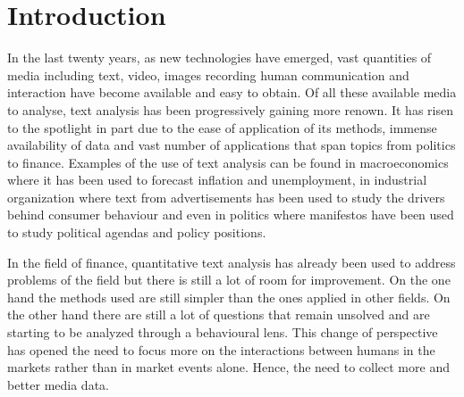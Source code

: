 \documentclass[a4paper, 12pt]{report}
\begin{document}
    
    
    
    
    
    
    
    
    
    \chapter{Introduction}
    
    In the last twenty years, as new technologies have emerged, vast quantities of media including text, video, images recording human communication and interaction have become available and easy to obtain. Of all these available media to analyse, text analysis has been progressively gaining more renown. It has risen to the spotlight in part due to the ease of application of its methods, immense availability of data and vast number of applications that span topics from politics to finance. Examples of the use of text analysis can be found in macroeconomics where it has been used to forecast inflation and unemployment, in industrial organization where text from advertisements has been used to study the drivers behind consumer behaviour and even in politics where manifestos have been used to study political agendas and policy positions. 
    
    In the field of finance, quantitative text analysis has already been used to address problems of the field but there is still a lot of room for improvement. On the one hand the methods used are still simpler than the ones applied in other fields. On the other hand there are still a lot of questions that remain unsolved and are starting to be analyzed through a behavioural lens. This change of perspective has opened the need to focus more on the interactions between humans in the markets rather than in market events alone. Hence, the need to collect more and better media data. 
    
\end{document}

